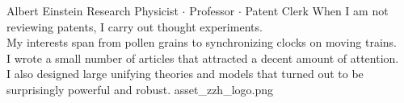 \documentclass[theme]{si_template/en_cv}
\begin{document}
    \header
    {Albert Einstein}
    {Research Physicist $\cdot$ Professor $\cdot$ Patent Clerk}
    {
        When I am not reviewing patents, I carry out thought experiments.\\
        My interests span from pollen grains to synchronizing clocks on moving trains.\\
        I wrote a small number of articles that attracted a decent amount of attention.\\
        I also designed large unifying theories and models that turned out to be\\
        surprisingly powerful and robust.%
    }
    {asset_zzh_logo.png}

\end{document}
